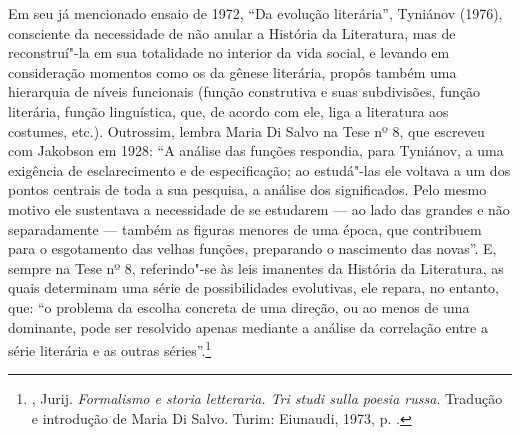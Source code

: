 Em seu já mencionado ensaio de 1972, ``Da evolução literária'', Tyniánov (1976),
consciente da necessidade de não anular a História da
Literatura, mas de reconstruí"-la em sua totalidade no interior da vida
social, e levando em consideração momentos como os da gênese literária,
propôs também uma hierarquia de níveis funcionais (função construtiva e
suas subdivisões, função literária, função linguística, que, de acordo
com ele, liga a literatura aos costumes, etc.). Outrossim, lembra Maria Di
Salvo na Tese nº 8, que escreveu com Jakobson em 1928: ``A análise das funções respondia, para Tyniánov, a
uma exigência de esclarecimento e de especificação; ao estudá"-las ele
voltava a um dos pontos centrais de toda a sua pesquisa, a análise dos
significados. Pelo mesmo motivo ele sustentava a necessidade de se
estudarem --- ao lado das grandes e não separadamente --- também as figuras
menores de uma época, que contribuem para o esgotamento das velhas
funções, preparando o nascimento das novas''. E, sempre na Tese nº 8,
referindo"-se às leis imanentes da História da Literatura, as quais determinam
uma série de possibilidades evolutivas, ele repara, no entanto, que: ``o
problema da escolha concreta de uma direção, ou ao menos de uma
dominante, pode ser resolvido apenas mediante a análise da correlação
entre a série literária e as outras séries''.\footnote{, Jurij. \emph{Formalismo e
 storia letteraria. Tri studi sulla poesia russa}. Tradução e introdução de Maria Di Salvo. Turim: Eiunaudi, 1973, p. .}

